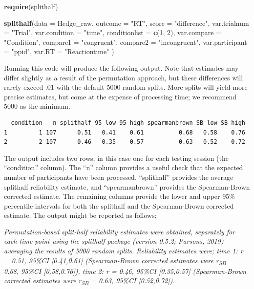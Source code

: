 \documentclass[english,,man,floatsintext]{apa6}
\newenvironment{Shaded}{\begin{snugshade}}{\end{snugshade}}
\newcommand{\DataTypeTok}[1]{\textcolor[rgb]{0.13,0.29,0.53}{#1}}
\newcommand{\DecValTok}[1]{\textcolor[rgb]{0.00,0.00,0.81}{#1}}
\newcommand{\KeywordTok}[1]{\textcolor[rgb]{0.13,0.29,0.53}{\textbf{#1}}}
\newcommand{\NormalTok}[1]{#1}
\newcommand{\StringTok}[1]{\textcolor[rgb]{0.31,0.60,0.02}{#1}}
\begin{document}
\begin{Shaded}
\begin{Highlighting}[]
\KeywordTok{require}\NormalTok{(splithalf)}

\KeywordTok{splithalf}\NormalTok{(}\DataTypeTok{data =}\NormalTok{ Hedge_raw,}
          \DataTypeTok{outcome =} \StringTok{"RT"}\NormalTok{,}
          \DataTypeTok{score =} \StringTok{"difference"}\NormalTok{,}
          \DataTypeTok{var.trialnum =} \StringTok{"Trial"}\NormalTok{,}
          \DataTypeTok{var.condition =} \StringTok{"time"}\NormalTok{,}
          \DataTypeTok{conditionlist =} \KeywordTok{c}\NormalTok{(}\DecValTok{1}\NormalTok{, }\DecValTok{2}\NormalTok{),}
          \DataTypeTok{var.compare =} \StringTok{"Condition"}\NormalTok{,}
          \DataTypeTok{compare1 =} \StringTok{"congruent"}\NormalTok{,}
          \DataTypeTok{compare2 =} \StringTok{"incongruent"}\NormalTok{,}
          \DataTypeTok{var.participant =} \StringTok{"ppid"}\NormalTok{,}
          \DataTypeTok{var.RT =} \StringTok{"Reactiontime"}\NormalTok{ )}
\end{Highlighting}
\end{Shaded}

Running this code will produce the following output. Note that estimates may differ slightly as a result of the permutation approach, but these differences will rarely exceed .01 with the default 5000 random splits. More splits will yield more precise estimates, but come at the expense of processing time; we recommend 5000 as the minimum.

\begin{verbatim}
  condition   n splithalf 95_low 95_high spearmanbrown SB_low SB_high
1         1 107      0.51   0.41    0.61          0.68   0.58    0.76
2         2 107      0.46   0.35    0.57          0.63   0.52    0.72
\end{verbatim}

The output includes two rows, in this case one for each testing session (the \enquote{condition} column). The \enquote{n} column provides a useful check that the expected number of participants have been processed. \enquote{splithalf} provides the average splithalf reliability estimate, and \enquote{spearmanbrown} provides the Spearman-Brown corrected estimate. The remaining columns provide the lower and upper 95\% percentile intervals for both the splithalf and the Spearman-Brown corrected estimate. The output might be reported as follows;

\emph{Permutation-based split-half reliability estimates were obtained, separately for each time-point using the splithalf package (version 0.5.2; Parsons, 2019) averaging the results of 5000 random splits. Reliability estimates were; time 1: r = 0.51, 95\%CI {[}0.41,0.61{]} (Spearman-Brown corrected estimates were r\textsubscript{SB} = 0.68, 95\%CI {[}0.58,0.76{]}), time 2: r = 0.46, 95\%CI {[}0.35,0.57{]} (Spearman-Brown corrected estimates were r\textsubscript{SB} = 0.63, 95\%CI {[}0.52,0.72{]}).}
\end{document}
